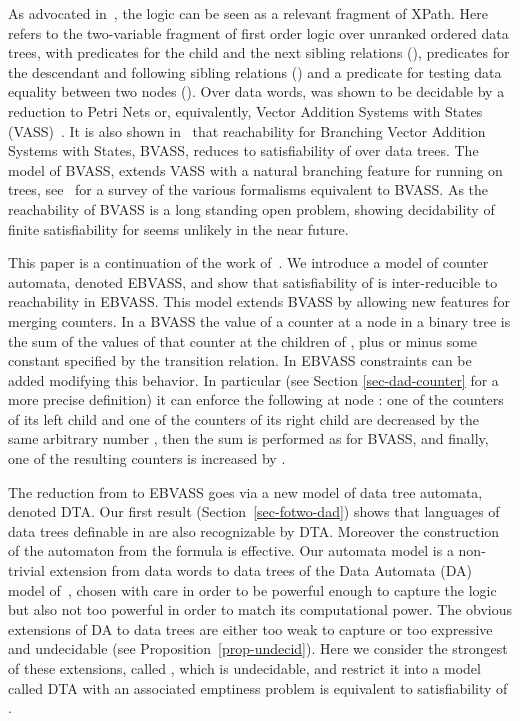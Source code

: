 \documentclass{CSML}
\newcommand\vass{\textup{VASS}\xspace}
\newcommand\bvass{\textup{BVASS}\xspace}
\newcommand\ebvass{\textup{EBVASS}\xspace}
\newcommand\xpath{\textup{XPath}\xspace}
\newcommand\dad{\textup{DTA}\xspace}
\begin{document}
As advocated in~\cite{BojanczykMSS09jacm}, the logic 
\fotwo can be seen as a relevant fragment of \xpath. 
Here \fotwo refers to the two-variable fragment of first
order logic over unranked ordered data trees, with predicates for the child and the next
sibling relations (), predicates for the descendant and following sibling
relations () and a predicate for testing data equality between two nodes ().
Over data words, \fotwo was shown to be decidable by a reduction to Petri Nets or,
equivalently, Vector Addition Systems with States (\vass)~\cite{BDMSS11}.  
It is also shown in~\cite{BojanczykMSS09jacm} that reachability for
Branching Vector Addition Systems with States, \bvass, 
reduces to satisfiability of \fotwo over data trees.  
The model of \bvass,  extends \vass with a natural branching feature for running
on trees, see~\cite{acl10} for a survey of the various formalisms equivalent to
\bvass.  As the reachability of \bvass is a long standing open problem, showing
decidability of finite satisfiability for \fotwo seems unlikely in the near future.

This paper is a continuation of the work of~\cite{BDMSS11,BojanczykMSS09jacm}.
We introduce a model of counter automata, denoted \ebvass, and show that
satisfiability of \fotwo is inter-reducible to reachability in \ebvass. 
This model extends \bvass by allowing new features for merging counters.  
In a \bvass the value of a counter at a node  in a binary tree
is the sum of the values of that counter at the children of , 
plus or minus some constant specified by the transition relation. 
In \ebvass constraints can be added modifying this behavior. In particular
(see Section \ref{sec-dad-counter} for a more precise definition) it can enforce the
following at node : 
one of the counters of its left child and one
of the counters of its right child are decreased by the same arbitrary number , 
then the sum is performed as for \bvass, and finally, 
one of the resulting counters is increased by .

The reduction from \fotwo to \ebvass goes via a new
model of data tree automata, denoted \dad. 
Our first result (Section~\ref{sec-fotwo-dad}) shows that languages of data trees 
definable in \fotwo are also recognizable by \dad.  
Moreover the construction of the automaton from the formula is effective. 
Our automata model is a non-trivial extension
from data words to data trees of the Data Automata (DA) model
of~\cite{BDMSS11}, chosen with care in order to be powerful enough to capture the logic 
but also not too powerful in order to match its computational power. 
The obvious extensions of DA to data trees are either too weak to capture \fotwo 
or too expressive and undecidable (see Proposition~\ref{prop-undecid}).
Here we consider the strongest of these extensions, called , 
which is undecidable,
and restrict it into a model called \dad
with an associated emptiness problem is equivalent to satisfiability of \fotwo.
\end{document}
